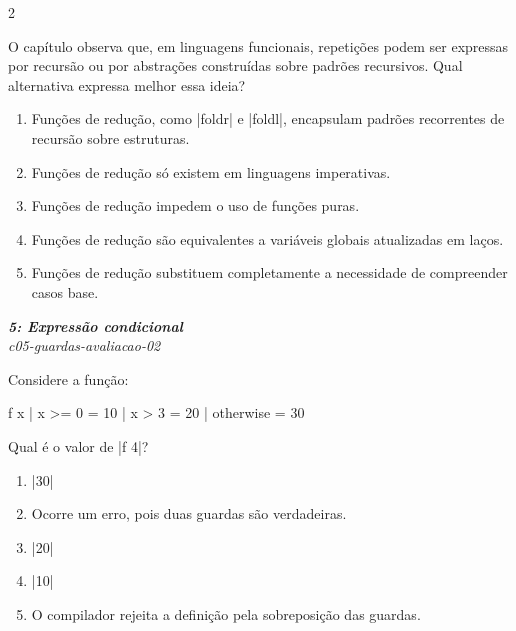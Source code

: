 \documentclass[a4paper,10pt,brazil]{article}
\begin{document}
\begin{multicols}{2}
\begin{flushright}
\end{flushright}
O capítulo observa que, em linguagens funcionais, repetições podem ser expressas por recursão ou por abstrações construídas sobre padrões recursivos. Qual alternativa expressa melhor essa ideia?

\begin{enumerate}
  \item Funções de redução, como \haskellinline|foldr| e \haskellinline|foldl|, encapsulam padrões recorrentes de recursão sobre estruturas.

  \item Funções de redução só existem em linguagens imperativas.

  \item Funções de redução impedem o uso de funções puras.

  \item Funções de redução são equivalentes a variáveis globais atualizadas em laços.

  \item Funções de redução substituem completamente a necessidade de compreender casos base.


\end{enumerate}

\begin{flushright}
  \footnotesize
  \textit{\textbf{5: Expressão condicional}}\\
  \textit{c05-guardas-avaliacao-02}\\

\end{flushright}
Considere a função:
\begin{haskellcode}
f x
  | x >= 0    = 10
  | x > 3     = 20
  | otherwise = 30
\end{haskellcode}
Qual é o valor de \haskellinline|f 4|?

\begin{enumerate}
  \item \haskellinline|30|

  \item Ocorre um erro, pois duas guardas são verdadeiras.

  \item \haskellinline|20|

  \item \haskellinline|10|

  \item O compilador rejeita a definição pela sobreposição das guardas.



\end{enumerate}
\end{multicols}
\end{document}
